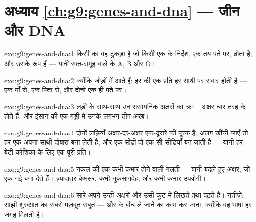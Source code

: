 \section*{अध्याय \ref{ch:g9:genes-and-dna} --- जीन और DNA}

\begin{solution}{exo:g9:genes-and-dna:1}
 किसी  का वह टुकड़ा है जो किसी एक  के निर्देश, एक तय पते
पर, ढोता है; और  उसके रूप हैं --- यानी रक्त-समूह वाले  के A, B
और O।
\end{solution}

\begin{solution}{exo:g9:genes-and-dna:2}
क्योंकि  जोड़ों में आते हैं: हर  की एक प्रति हर साथी पर सवार
होती है --- एक माँ से, एक पिता से, और दोनों एक ही पते पर।
\end{solution}

\begin{solution}{exo:g9:genes-and-dna:3}
लड़ी के साथ-साथ उन रासायनिक अक्षरों का क्रम। अक्षर चार तरह के होते हैं,
और इंसान की एक गड्डी में उनके लगभग तीन अरब।
\end{solution}

\begin{solution}{exo:g9:genes-and-dna:4}
दोनों लड़ियाँ अक्षर-दर-अक्षर एक-दूसरे की पूरक हैं: अलग खींची जाएँ तो हर
एक अपना साथी दोबारा बना लेती है, और एक सीढ़ी दो एक-सी सीढ़ियाँ बन जाती है
--- यानी हर बेटी-कोशिका के लिए एक पूरी प्रति।
\end{solution}

\begin{solution}{exo:g9:genes-and-dna:5}
नक़ल की एक कभी-कभार होने वाली ग़लती --- यानी बदले हुए अक्षर, जो एक नई
 बना देते हैं। ज़्यादातर बेअसर, कभी नुक़सानदेह, और कभी-कभार
उपयोगी।
\end{solution}

\begin{solution}{exo:g9:genes-and-dna:6}
सारे  अपने  उन्हीं  अक्षरों और उसी कूट में लिखते तथा पढ़ते हैं।
नतीजे: साझी शुरुआत का सबसे मज़बूत सबूत --- और  के बीच  ले
जाने का काम कर जाना, क्योंकि वह भाषा हर जगह मिलती है।
\end{solution}


